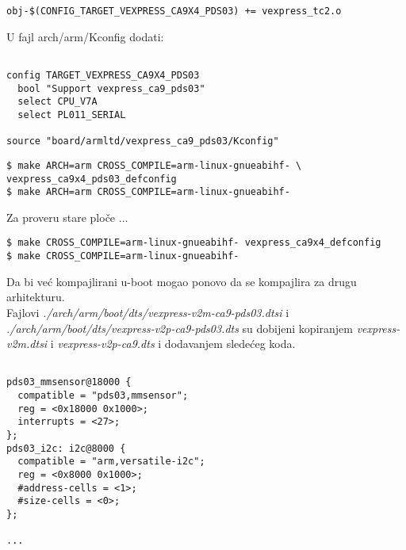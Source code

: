 \documentclass{article}
\begin{document}
\begin{file}
\begin{verbatim}
obj-$(CONFIG_TARGET_VEXPRESS_CA9X4_PDS03) += vexpress_tc2.o

\end{verbatim}
\end{file}


U fajl arch/arm/Kconfig dodati:

\begin{file}
\begin{verbatim}

config TARGET_VEXPRESS_CA9X4_PDS03
  bool "Support vexpress_ca9_pds03"
  select CPU_V7A
  select PL011_SERIAL

source "board/armltd/vexpress_ca9_pds03/Kconfig"

\end{verbatim}
\end{file}

\begin{commandline}
  \begin{verbatim}
$ make ARCH=arm CROSS_COMPILE=arm-linux-gnueabihf- \
vexpress_ca9x4_pds03_defconfig
$ make ARCH=arm CROSS_COMPILE=arm-linux-gnueabihf-
  \end{verbatim}
\end{commandline}

Za proveru stare ploče ...

\begin{commandline}
  \begin{verbatim}
$ make CROSS_COMPILE=arm-linux-gnueabihf- vexpress_ca9x4_defconfig
$ make CROSS_COMPILE=arm-linux-gnueabihf-
  \end{verbatim}
\end{commandline}

Da bi već kompajlirani u-boot mogao ponovo da se kompajlira za drugu arhitekturu. \\

Fajlovi \textit{./arch/arm/boot/dts/vexpress-v2m-ca9-pds03.dtsi} i \textit{./arch/arm/boot/dts/vexpress-v2p-ca9-pds03.dts} su dobijeni kopiranjem \textit{vexpress-v2m.dtsi} i \textit{vexpress-v2p-ca9.dts} i dodavanjem sledećeg koda.

\begin{file}
\begin{verbatim}

pds03_mmsensor@18000 {
  compatible = "pds03,mmsensor";
  reg = <0x18000 0x1000>;
  interrupts = <27>;
};
pds03_i2c: i2c@8000 {
  compatible = "arm,versatile-i2c";
  reg = <0x8000 0x1000>;
  #address-cells = <1>;
  #size-cells = <0>;
};

...
\end{verbatim}
\end{file}
\end{document}
